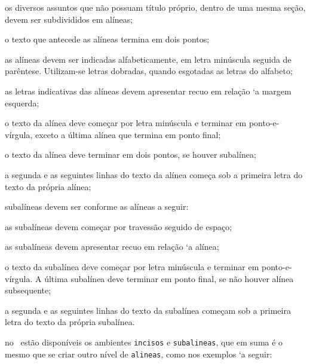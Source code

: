 \begin{alineas}

  \item os diversos assuntos que não possuam título próprio, dentro de uma mesma
  seção, devem ser subdivididos em alíneas; 
  
  \item o texto que antecede as alíneas termina em dois pontos;
  \item as alíneas devem ser indicadas alfabeticamente, em letra minúscula
  seguida de par\^entese. Utilizam-se letras dobradas, quando esgotadas as
  letras do alfabeto;

  \item as letras indicativas das alíneas devem apresentar recuo em relação `a
  margem esquerda;

  \item o texto da alínea deve começar por letra minúscula e terminar em
  ponto-e-vírgula, exceto a última alínea que termina em ponto final;

  \item o texto da alínea deve terminar em dois pontos, se houver subalínea;

  \item a segunda e as seguintes linhas do texto da alínea começa sob a
  primeira letra do texto da própria alínea;
  
  \item subalíneas \cite{nbr6024} devem ser conforme as alíneas a
  seguir:

  \begin{alineas}
     \item as subalíneas devem começar por travessão seguido de espaço;

     \item as subalíneas devem apresentar recuo em relação `a alínea;

     \item o texto da subalínea deve começar por letra minúscula e terminar em
     ponto-e-vírgula. A última subalínea deve terminar em ponto final, se não
     houver alínea subsequente;

     \item a segunda e as seguintes linhas do texto da subalínea começam sob a
     primeira letra do texto da própria subalínea.
  \end{alineas}
  
  \item no \abnTeX\ estão disponíveis os ambientes \texttt{incisos} e
  \texttt{subalineas}, que em suma \'e o mesmo que se criar outro nível de
  \texttt{alineas}, como nos exemplos `a seguir:
  

\end{alineas}
